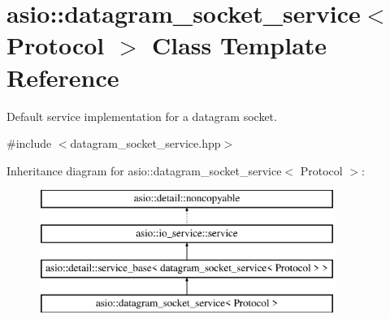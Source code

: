 \hypertarget{classasio_1_1datagram__socket__service}{}\section{asio\+:\+:datagram\+\_\+socket\+\_\+service$<$ Protocol $>$ Class Template Reference}
\label{classasio_1_1datagram__socket__service}


Default service implementation for a datagram socket.  




{\ttfamily \#include $<$datagram\+\_\+socket\+\_\+service.\+hpp$>$}

Inheritance diagram for asio\+:\+:datagram\+\_\+socket\+\_\+service$<$ Protocol $>$\+:\begin{figure}[H]
\begin{center}
\leavevmode
\includegraphics[height=4.000000cm]{classasio_1_1datagram__socket__service}
\end{center}
\end{figure}

